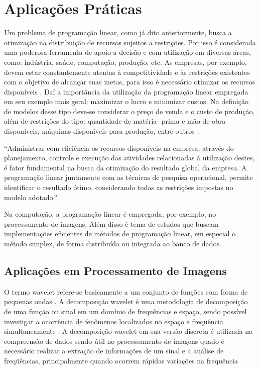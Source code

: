 \section{Aplicações Práticas}
Um problema de programação linear, como já dito anteriormente, busca a otimização na distribuição de recursos sujeitos a restrições. Por isso é considerada uma poderosa ferramenta de apoio a decisão \cite{FrossardMaxMin} e com utilização em diversas áreas, como: indústria, saúde, computação, produção, etc.
As empresas, por exemplo, devem estar constantemente atentas à competitividade e às restrições existentes com o objetivo de alcançar suas metas, para isso é necessário otimizar os recursos disponíveis \cite{FrossardMaxMin}. Daí a importância da utilização da programação linear empregada em seu exemplo mais geral: maximizar o lucro e minimizar custos.  Na definição de modelos desse tipo deve-se considerar o preço de venda e o custo de produção, além de restrições do tipo: quantidade de matéria- prima e mão-de-obra disponíveis, máquinas disponíveis para produção, entre outros \cite{FrossardMaxMin}.

\begin{citacao}
“Administrar com eficiência os recursos disponíveis na empresa, através do planejamento, controle e execução das atividades relacionadas á utilização destes, é fator fundamental na busca da otimização do resultado global da empresa. A programação linear juntamente com as técnicas de pesquisa operacional, permite identificar o resultado ótimo, considerando todas as restrições impostas no modelo adotado.” \cite[p.~31]{FrossardMaxMin}
\end{citacao}

Na computação, a programação linear é empregada, por exemplo, no processamento de imagens. Além disso é tema de estudos que buscam implementações eficientes de métodos de programação linear, em especial o método simplex, de forma distribuída ou integrada ao banco de dados.

\subsection{Aplicações em Processamento de Imagens}
O termo wavelet refere-se basicamente a um conjunto de funções com forma de pequenas ondas \cite{Ondaletas}. A decomposição wavelet é uma metodologia de decomposição de uma função ou sinal em um domínio de frequências e espaço, sendo possível investigar a ocorrência de fenômenos localizados no espaço e frequência simultaneamente \cite{Peixoto-wavelet}.
A decomposição wavelet em sua versão discreta é utilizada na compreensão de dados sendo útil no processamento de imagens quado é necessário realizar a extração de informações de um sinal e a análise de freqüências, principalmente quando ocorrem rápidas variações na frequência \cite{Leite-wavelet}

